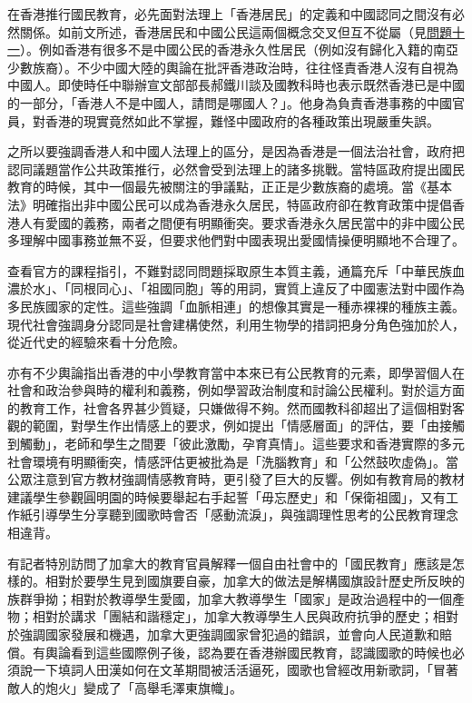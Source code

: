 在香港推行國民教育，必先面對法理上「香港居民」的定義和中國認同之間沒有必然關係。如前文所述，香港居民和中國公民這兩個概念交叉但互不從屬（見\hyperref[sec:sec11]{問題十一}）。例如香港有很多不是中國公民的香港永久性居民（例如沒有歸化入籍的南亞少數族裔）。不少中國大陸的輿論在批評香港政治時，往往怪責香港人沒有自視為中國人。即使時任中聯辦宣文部部長郝鐵川談及國教科時也表示既然香港已是中國的一部分，「香港人不是中國人，請問是哪國人？」。他身為負責香港事務的中國官員，對香港的現實竟然如此不掌握，難怪中國政府的各種政策出現嚴重失誤。

之所以要強調香港人和中國人法理上的區分，是因為香港是一個法治社會，政府把認同議題當作公共政策推行，必然會受到法理上的諸多挑戰。當特區政府提出國民教育的時候，其中一個最先被關注的爭議點，正正是少數族裔的處境。當《基本法》明確指出非中國公民可以成為香港永久居民，特區政府卻在教育政策中提倡香港人有愛國的義務，兩者之間便有明顯衝突。要求香港永久居民當中的非中國公民多理解中國事務並無不妥，但要求他們對中國表現出愛國情操便明顯地不合理了。

查看官方的課程指引，不難對認同問題採取原生本質主義，通篇充斥「中華民族血濃於水」、「同根同心」、「祖國同胞」等的用詞，實質上違反了中國憲法對中國作為多民族國家的定性。這些強調「血脈相連」的想像其實是一種赤裸裸的種族主義。現代社會強調身分認同是社會建構使然，利用生物學的措詞把身分角色強加於人，從近代史的經驗來看十分危險。

亦有不少輿論指出香港的中小學教育當中本來已有公民教育的元素，即學習個人在社會和政治參與時的權利和義務，例如學習政治制度和討論公民權利。對於這方面的教育工作，社會各界甚少質疑，只嫌做得不夠。然而國教科卻超出了這個相對客觀的範圍，對學生作出情感上的要求，例如提出「情感層面」的評估，要「由接觸到觸動」，老師和學生之間要「彼此激勵，孕育真情」。這些要求和香港實際的多元社會環境有明顯衝突，情感評估更被批為是「洗腦教育」和「公然鼓吹虛偽」。當公眾注意到官方教材強調情感教育時，更引發了巨大的反響。例如有教育局的教材建議學生參觀圓明園的時候要舉起右手起誓「毋忘歷史」和「保衛祖國」，又有工作紙引導學生分享聽到國歌時會否「感動流淚」，與強調理性思考的公民教育理念相違背。

有記者特別訪問了加拿大的教育官員解釋一個自由社會中的「國民教育」應該是怎樣的。相對於要學生見到國旗要自豪，加拿大的做法是解構國旗設計歷史所反映的族群爭拗；相對於教導學生愛國，加拿大教導學生「國家」是政治過程中的一個產物；相對於講求「團結和諧穩定」，加拿大教導學生人民與政府抗爭的歷史；相對於強調國家發展和機遇，加拿大更強調國家曾犯過的錯誤，並會向人民道歉和賠償。有輿論看到這些國際例子後，認為要在香港辦國民教育，認識國歌的時候也必須說一下填詞人田漢如何在文革期間被活活逼死，國歌也曾經改用新歌詞，「冒著敵人的炮火」變成了「高舉毛澤東旗幟」。

